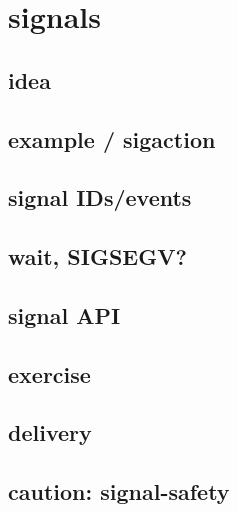 


\section{signals}

\subsection{idea}



\subsection{example / sigaction}



\subsection{signal IDs/events}




\subsection{wait, SIGSEGV?}



\subsection{signal API}




\subsection{exercise}


\subsection{delivery}



\subsection{caution: signal-safety}

